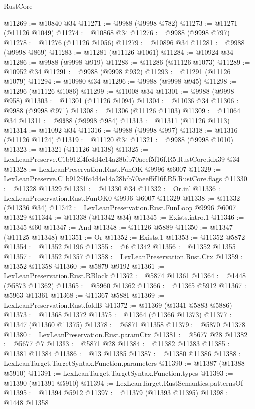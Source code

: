 \begin{lexlean}{RustCore}
\begin{coremodule}
@11269 := @10840 @34
@11271 := @9988 (@9998 @782)
@11273 := @11271 (@11126 @1049)
@11274 := @10868 @34
@11276 := @9988 (@9998 @797)
@11278 := @11276 (@11126 @1056)
@11279 := @10896 @34
@11281 := @9988 (@9998 @869)
@11283 := @11281 (@11126 @1061)
@11284 := @10924 @34
@11286 := @9988 (@9998 @919)
@11288 := @11286 (@11126 @1073)
@11289 := @10952 @34
@11291 := @9988 (@9998 @932)
@11293 := @11291 (@11126 @1079)
@11294 := @10980 @34
@11296 := @9988 (@9998 @945)
@11298 := @11296 (@11126 @1086)
@11299 := @11008 @34
@11301 := @9988 (@9998 @958)
@11303 := @11301 (@11126 @1094)
@11304 := @11036 @34
@11306 := @9988 (@9998 @971)
@11308 := @11306 (@11126 @1103)
@11309 := @11064 @34
@11311 := @9988 (@9998 @984)
@11313 := @11311 (@11126 @1113)
@11314 := @11092 @34
@11316 := @9988 (@9998 @997)
@11318 := @11316 (@11126 @1124)
@11319 := @11120 @34
@11321 := @9988 (@9998 @1010)
@11323 := @11321 (@11126 @1138)
@11325 := LexLeanPreserve.C1b912f4fc4d4e14a28bfb70aeef5f16f.R5.RustCore.idx39 @34
@11328 := LexLeanPreservation.Rust.FunOK @9996 @6007
@11329 := LexLeanPreserve.C1b912f4fc4d4e14a28bfb70aeef5f16f.R5.RustCore.flags
@11330 := @11328 @11329
@11331 := @11330 @34
@11332 := Or.inl
@11336 := LexLeanPreservation.Rust.FunOK0 @9996 @6007 @11329
@11338 := @11332 (@11336 @34)
@11342 := LexLeanPreservation.Rust.FunLoop @9996 @6007 @11329
@11344 := @11338 (@11342 @34)
@11345 := Exists.intro.{1}
@11346 := @11345 @60
@11347 := And
@11348 := @11126 @5889
@11350 := @11347 (@11125 @11348)
@11351 := Or
@11352 := Exists.{1}
@11353 := @11352 @5872
@11354 := @11352 @1196
@11355 := @6 @1342
@11356 := @11352 @11355
@11357 := @11352 @1357
@11358 := LexLeanPreservation.Rust.Ctx
@11359 := @11352 @11358
@11360 := @5879 @9192
@11361 := LexLeanPreservation.Rust.RBlock
@11362 := @5874 @11361
@11364 := @1448 (@5873 @11362)
@11365 := @5960 @11362
@11366 := @11365 @5912
@11367 := @5963 @11361
@11368 := @11367 @5881
@11369 := LexLeanPreservation.Rust.foldB
@11372 := @11369 (@1341 @5883 @5886)
@11373 := @11368 @11372
@11375 := @11364 (@11366 @11373)
@11377 := @11347 (@11360 @11375)
@11378 := @5871 @11358
@11379 := @5870 @11378
@11380 := LexLeanPreservation.Rust.paramCtx
@11381 := @5677 @28
@11382 := @5677 @7
@11383 := @5871 @28
@11384 := @11382 @11383
@11385 := @11381 @11384
@11386 := @13 @11385
@11387 := @11380 @11386
@11388 := LexLeanTarget.TargetSyntax.Function.parameters
@11390 := @11387 (@11388 @5910)
@11391 := LexLeanTarget.TargetSyntax.Function.types
@11393 := @11390 (@11391 @5910)
@11394 := LexLeanTarget.RustSemantics.patternsOf
@11395 := @11394 @5912
@11397 := @11379 (@11393 @11395)
@11398 := @1448 @11358

\end{coremodule}
\end{lexlean}
